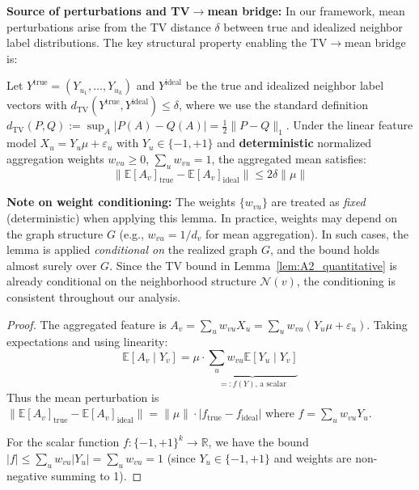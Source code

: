 \begin{remark}
\textbf{Source of perturbations and TV$\to$mean bridge:} In our framework, mean perturbations arise from the TV distance $\delta$ between true and idealized neighbor label distributions. The key structural property enabling the TV$\to$mean bridge is:

\begin{lemma}
\label{lem:tv_to_mean}
Let $Y^{\mathrm{true}} = (Y_{u_1}, \ldots, Y_{u_k})$ and $Y^{\mathrm{ideal}}$ be the true and idealized neighbor label vectors with $d_{\mathrm{TV}}(Y^{\mathrm{true}}, Y^{\mathrm{ideal}}) \leq \delta$, where we use the standard definition $d_{\mathrm{TV}}(P, Q) := \sup_{A} |P(A) - Q(A)| = \frac{1}{2}\|P - Q\|_1$. Under the linear feature model $X_u = Y_u \mu + \varepsilon_u$ with $Y_u \in \{-1, +1\}$ and \textbf{deterministic} normalized aggregation weights $w_{vu} \geq 0$, $\sum_u w_{vu} = 1$, the aggregated mean satisfies:
\begin{equation}
    \|\mathbb{E}[A_v]_{\mathrm{true}} - \mathbb{E}[A_v]_{\mathrm{ideal}}\| \leq 2\delta \|\mu\|
\end{equation}

\textbf{Note on weight conditioning:} The weights $\{w_{vu}\}$ are treated as \textit{fixed} (deterministic) when applying this lemma. In practice, weights may depend on the graph structure $G$ (e.g., $w_{vu} = 1/d_v$ for mean aggregation). In such cases, the lemma is applied \textit{conditional on} the realized graph $G$, and the bound holds almost surely over $G$. Since the TV bound in Lemma~\ref{lem:A2_quantitative} is already conditional on the neighborhood structure $\mathcal{N}(v)$, the conditioning is consistent throughout our analysis.
\end{lemma}

\begin{proof}
The aggregated feature is $A_v = \sum_u w_{vu} X_u = \sum_u w_{vu} (Y_u \mu + \varepsilon_u)$. Taking expectations and using linearity:
\begin{equation}
    \mathbb{E}[A_v \mid Y_v] = \mu \cdot \underbrace{\sum_u w_{vu} \mathbb{E}[Y_u \mid Y_v]}_{=: f(Y) \text{, a scalar}}
\end{equation}
Thus the mean perturbation is $\|\mathbb{E}[A_v]_{\mathrm{true}} - \mathbb{E}[A_v]_{\mathrm{ideal}}\| = \|\mu\| \cdot |f_{\mathrm{true}} - f_{\mathrm{ideal}}|$ where $f = \sum_u w_{vu} Y_u$.

For the scalar function $f: \{-1,+1\}^k \to \mathbb{R}$, we have the bound $|f| \leq \sum_u w_{vu} |Y_u| = \sum_u w_{vu} = 1$ (since $Y_u \in \{-1,+1\}$ and weights are non-negative summing to 1).


\end{proof}
\end{remark}
